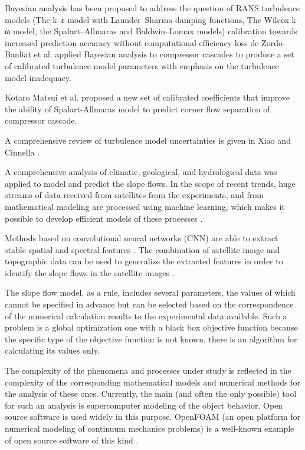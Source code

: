 \documentclass[sensors,article,submit,moreauthors,pdftex]{Definitions/mdpi}
\begin{document}
Bayesian analysis has been proposed to address the question of RANS turbulence models (The k–ε model with Launder–Sharma damping functions, The Wilcox k–ω model, the Spalart–Allmaras and Baldwin–Lomax models) calibration towards increased prediction accuracy without computational efficiency loss \cite{Edeling2014a,Edeling2014b}  de Zordo– Banliat et al. \cite{deZordoBanliat2020}  applied Bayesian analysis to compressor cascades to produce a set of calibrated turbulence model parameters with emphasis on the turbulence model inadequacy.

Kotaro Matsui et al. \cite{Matsui2021} proposed a new set of calibrated coefficients that improve the ability of Spalart-Allmaras model to predict corner flow separation of compressor cascade.

A comprehensive review of turbulence model uncertainties is given in Xiao and Cinnella \cite{Xiao2019}. 


A comprehensive analysis of climatic, geological, and hydrological data was applied to model and predict the slope flows. In the scope of recent trends, huge streams of data received from satellites from the experiments, and from mathematical modeling are processed using machine learning, which makes it possible to develop efficient models of these processes \cite{GeoML, Ma2020}.

Methods based on convolutional neural networks (CNN) are able to extract stable spatial and spectral features \cite{Maggiori2017}. The combination of satellite image and topographic data can be used to generalize the extracted features in order to identify the slope flows in the satellite images \cite{Qin2021, Prakash2021}.

The slope flow model, as a rule, includes several parameters, the values of which cannot be specified in advance but can be selected based on the correspondence of the numerical calculation results to the experimental data available. Such a problem is a global optimization one with a black box objective function because the specific type of the objective function is not known, there is an algorithm for calculating its values only.

The complexity of the phenomena and processes under study is reflected in the complexity of the corresponding mathematical models and numerical methods for the analysis of these ones. Currently, the main (and often the only possible) tool for such an analysis is supercomputer modeling of the object behavior. Open source software is used widely in this purpose. OpenFOAM (an open platform for numerical modeling of continuum mechanics problems) is a well-known example of open source software of this kind \cite{OpenFOAM}. 
\end{document}
